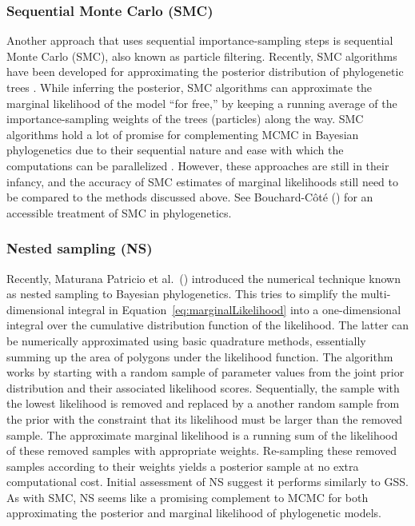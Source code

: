 \subsubsection{Sequential Monte Carlo (SMC)}
Another approach that uses sequential importance-sampling steps is sequential
Monte Carlo (SMC), also known as particle filtering.
Recently, SMC algorithms have been developed for approximating the posterior
distribution of phylogenetic trees \citep{Jordan2012,Bouchard2014}.
While inferring the posterior, SMC algorithms can approximate the marginal
likelihood of the model ``for free,'' by keeping a running average of the
importance-sampling weights of the trees (particles) along the way.
SMC algorithms hold a lot of promise for complementing MCMC in Bayesian
phylogenetics due to their sequential nature and ease with which the
computations can be parallelized
\citep{Jordan2012,Dinh2016preprint,Fourment2017preprint}.
However, these approaches are still in their infancy, and the accuracy of SMC
estimates of marginal likelihoods still need to be compared to the methods
discussed above.
See Bouchard-C\^{o}t\'{e} (\citeyear{Bouchard2014}) for an accessible treatment
of SMC in phylogenetics.

\subsubsection{Nested sampling (NS)}
Recently, Maturana Patricio et al.\ (\citeyear{Maturana2017})
introduced the numerical technique known as nested sampling to Bayesian
phylogenetics.
This tries to simplify the multi-dimensional integral in
Equation~\ref{eq:marginalLikelihood}
into a one-dimensional integral over the cumulative distribution function
of the likelihood.
The latter can be numerically approximated using basic quadrature methods,
essentially summing up the area of polygons under the likelihood function.
The algorithm works by starting with a random sample of parameter values
from the joint prior distribution and their associated likelihood
scores.
Sequentially, the sample with the lowest likelihood is removed and replaced by
a another random sample from the prior with the constraint that its likelihood
must be larger than the removed sample.
The approximate marginal likelihood is a running sum of the likelihood of these
removed samples with appropriate weights.
Re-sampling these removed samples according to their weights yields a posterior
sample at no extra computational cost.
Initial assessment of NS suggest it performs similarly to GSS.
As with SMC, NS seems like a promising complement to MCMC for both
approximating the posterior and marginal likelihood of phylogenetic models.


